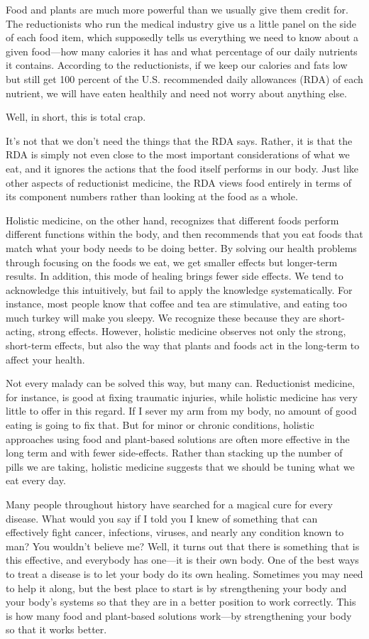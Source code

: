 Food and plants are much more powerful than we usually give them credit
for. The reductionists who run the medical industry give us a little
panel on the side of each food item, which supposedly tells us
everything we need to know about a given food---how many calories it has
and what percentage of our daily nutrients it contains. According to
the reductionists, if we keep our calories and fats low but still get
100 percent of the U.S. recommended daily allowances (RDA) of each
nutrient, we will have eaten healthily and need not worry about
anything else.

Well, in short, this is total crap.

It's not that we don't need the things
that the RDA says. Rather, it is that the RDA is simply not even close
to the most important considerations of what we eat, and it ignores the
actions that the food itself performs in our body. Just like other
aspects of reductionist medicine, the RDA views food entirely in terms
of its component numbers rather than looking at the food as a whole. 

Holistic medicine, on the other hand, recognizes that different foods
perform different functions within the body, and then recommends that
you eat foods that match what your body needs to be doing better. By
solving our health problems through focusing on
the foods we eat, we get smaller effects but longer-term results. In
addition, this mode of healing brings fewer side effects.  We tend to
acknowledge this intuitively, but fail to apply the knowledge
systematically.  For instance, most people know that coffee and tea are
stimulative, and eating too much turkey will make you sleepy.  We
recognize these because they are short-acting, strong effects. 
However, holistic medicine observes not only the strong, short-term
effects, but also the way that plants and foods act
in the long-term to affect your health.

Not every malady can be solved this way, but many can. Reductionist
medicine, for instance, is good at fixing traumatic injuries, while
holistic medicine has very little to offer in this regard. If I sever my arm from my
body, no amount of good eating is going to fix that. But for minor or
chronic conditions, holistic approaches using food and plant-based
solutions are often more effective in the long term and with fewer
side-effects.  Rather than stacking up the number of pills we are
taking, holistic medicine suggests that we should be tuning what we eat
every day.

Many people throughout history have searched for a magical cure for
every disease. What would you say if I told you I knew of something
that can effectively fight cancer, infections, viruses, and nearly any condition
known to man?  You wouldn't believe me?  Well, it turns out that there is
something that is this effective, and everybody has one---it is their own
body. One of the best ways to treat a disease is to let
your body do its own healing. Sometimes you may need to help it along,
but the best place to start is by strengthening your body and your
body's systems so that they are in a better position
to work correctly. This is how many food and plant-based solutions
work---by strengthening your body so that it works better.

